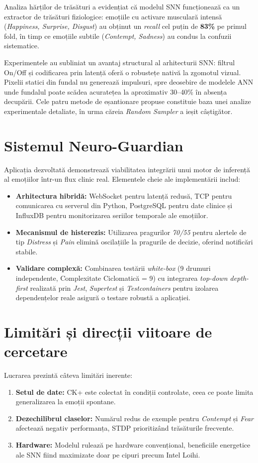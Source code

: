 Analiza hărților de trăsături a evidențiat că modelul SNN funcționează ca un extractor de trăsături fiziologice: emoțiile cu activare musculară intensă (\textit{Happiness, Surprise, Disgust}) au obținut un \textit{recall} cel puțin de \textbf{83\%} pe primul fold, în timp ce emoțiile subtile (\textit{Contempt, Sadness}) au condus la confuzii sistematice.

Experimentele au subliniat un avantaj structural al arhitecturii SNN: filtrul On/Off și codificarea prin latență oferă o robustețe nativă la zgomotul vizual. Pixelii statici din fundal nu generează impulsuri, spre deosebire de modelele ANN unde fundalul poate scădea acuratețea la aproximativ 30--40\% în absența decupării. Cele patru metode de eșantionare propuse constituie baza unei analize experimentale detaliate, în urma căreia \textit{Random Sampler} a ieșit câștigător.

\section*{Sistemul Neuro-Guardian}

Aplicația dezvoltată demonstrează viabilitatea integrării unui motor de inferență al emoțiilor într-un flux clinic real. Elementele cheie ale implementării includ:
\begin{itemize}
	\item \textbf{Arhitectura hibridă:} WebSocket pentru latență redusă, TCP pentru comunicarea cu serverul din Python, PostgreSQL pentru date clinice și InfluxDB pentru monitorizarea seriilor temporale ale emoțiilor.
	\item \textbf{Mecanismul de histerezis:} Utilizarea pragurilor \textit{70/55} pentru alertele de tip \textit{Distress} și \textit{Pain} elimină oscilațiile la pragurile de decizie, oferind notificări stabile.
	\item \textbf{Validare complexă:} Combinarea testării \textit{white-box} (9 drumuri independente, Complexitate Ciclomatică = 9) cu integrarea \textit{top-down depth-first} realizată prin \textit{Jest}, \textit{Supertest} și \textit{Testcontainers} pentru izolarea dependențelor reale asigură o testare robustă a aplicației. 
\end{itemize}

\section*{Limitări și direcții viitoare de cercetare}

Lucrarea prezintă câteva limitări inerente:
\begin{enumerate}
	\item \textbf{Setul de date:} CK+ este colectat în condiții controlate, ceea ce poate limita generalizarea la emoții spontane.
	\item \textbf{Dezechilibrul claselor:} Numărul redus de exemple pentru \textit{Contempt} și \textit{Fear} afectează negativ performanța, STDP prioritizând trăsăturile frecvente.
	\item \textbf{Hardware:} Modelul rulează pe hardware convențional, beneficiile energetice ale SNN fiind maximizate doar pe cipuri precum Intel Loihi.
\end{enumerate}

